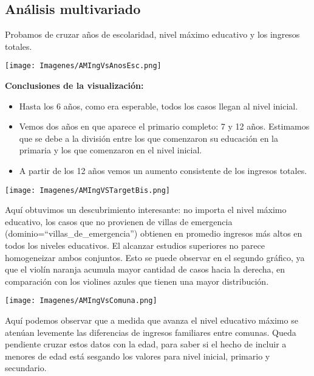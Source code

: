 \documentclass[a4paper]{article}
\begin{document}
    \subsection{Análisis multivariado}
 
        Probamos de cruzar años de escolaridad, nivel máximo educativo y los ingresos totales.
 
        \begin{center}
            \texttt{[image: Imagenes/AMIngVsAnosEsc.png]}
        \end{center}
 
        \textbf{Conclusiones de la visualización:}
 
        \begin{itemize}
            \item Hasta los 6 años, como era esperable, todos los casos llegan al nivel inicial.
            \item Vemos dos años en que aparece el primario completo: 7 y 12 años. Estimamos que se debe a la división entre los que comenzaron su educación en la primaria y los que comenzaron en el nivel inicial.
            \item A partir de los 12 años vemos un aumento consistente de los ingresos totales.
        \end{itemize}
 
        \begin{center}
            \texttt{[image: Imagenes/AMIngVSTargetBis.png]}
        \end{center}
 
        Aquí obtuvimos un descubrimiento interesante: no importa el nivel máximo educativo, los casos que no provienen de villas de emergencia (dominio=``villas\_de\_emergencia'') obtienen en promedio ingresos más altos en todos los niveles educativos. El alcanzar estudios superiores no parece homogeneizar ambos conjuntos. Esto se puede observar en el segundo gráfico, ya que el violín naranja acumula mayor cantidad de casos hacia la derecha, en comparación con los violines azules que tienen una mayor distribución.
 
        \begin{center}
            \texttt{[image: Imagenes/AMIngVsComuna.png]}
        \end{center}
 
        Aquí podemos observar que a medida que avanza el nivel educativo máximo se atenúan levemente las diferencias de ingresos familiares entre comunas. Queda pendiente cruzar estos datos con la edad, para saber si el hecho de incluir a menores de edad está sesgando los valores para nivel inicial, primario y secundario.
 
\end{document}
